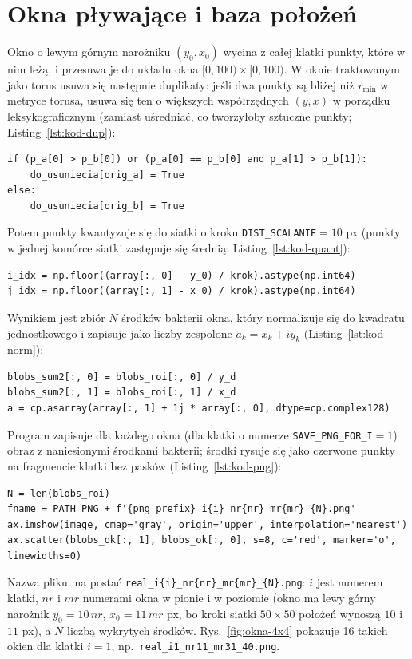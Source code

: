 \documentclass[12pt,a4paper,twoside,openright]{report}
\theoremstyle{definition}
\theoremstyle{remark}
\begin{document}
{\section{Okna pływające i baza położeń}
Okno o lewym górnym narożniku $(y_0,x_0)$ wycina z całej klatki punkty, które w nim leżą, i przesuwa je do układu okna $[0,100)\times[0,100)$. W oknie traktowanym jako torus usuwa się następnie duplikaty: jeśli dwa punkty są bliżej niż $r_{\min}$ w metryce torusa, usuwa się ten o większych współrzędnych $(y,x)$ w porządku leksykograficznym (zamiast uśredniać, co tworzyłoby sztuczne punkty; Listing~\ref{lst:kod-dup}):
\begin{lstlisting}[style=pykod,caption={Reguła usuwania duplikatów torusowych w oknie},label={lst:kod-dup}]
if (p_a[0] > p_b[0]) or (p_a[0] == p_b[0] and p_a[1] > p_b[1]):
    do_usuniecia[orig_a] = True
else:
    do_usuniecia[orig_b] = True
\end{lstlisting}
Potem punkty kwantyzuje się do siatki o kroku \texttt{DIST\_SCALANIE}$=10$ px (punkty w jednej komórce siatki zastępuje się średnią; Listing~\ref{lst:kod-quant}):
\begin{lstlisting}[style=pykod,caption={Kwantyzacja położeń do siatki o kroku \texttt{DIST\_SCALANIE}},label={lst:kod-quant}]
i_idx = np.floor((array[:, 0] - y_0) / krok).astype(np.int64)
j_idx = np.floor((array[:, 1] - x_0) / krok).astype(np.int64)
\end{lstlisting}
Wynikiem jest zbiór $N$ środków bakterii okna, który normalizuje się do kwadratu jednostkowego i zapisuje jako liczby zespolone $a_k=x_k+iy_k$ (Listing~\ref{lst:kod-norm}):
\begin{lstlisting}[style=pykod,caption={Normalizacja położeń do kwadratu jednostkowego i zapis w postaci zespolonej},label={lst:kod-norm}]
blobs_sum2[:, 0] = blobs_roi[:, 0] / y_d
blobs_sum2[:, 1] = blobs_roi[:, 1] / x_d
a = cp.asarray(array[:, 1] + 1j * array[:, 0], dtype=cp.complex128)
\end{lstlisting}
Program zapisuje dla każdego okna (dla klatki o numerze \texttt{SAVE\_PNG\_FOR\_I}$=1$) obraz z naniesionymi środkami bakterii; środki rysuje się jako czerwone punkty na fragmencie klatki bez pasków (Listing~\ref{lst:kod-png}):
\begin{lstlisting}[style=pykod,caption={Zapis okna z naniesionymi środkami bakterii (\texttt{\_zapisz\_png})},label={lst:kod-png}]
N = len(blobs_roi)
fname = PATH_PNG + f'{png_prefix}_i{i}_nr{nr}_mr{mr}_{N}.png'
ax.imshow(image, cmap='gray', origin='upper', interpolation='nearest')
ax.scatter(blobs_ok[:, 1], blobs_ok[:, 0], s=8, c='red', marker='o', linewidths=0)
\end{lstlisting}
Nazwa pliku ma postać \texttt{real\_i\{i\}\_nr\{nr\}\_mr\{mr\}\_\{N\}.png}: $i$ jest numerem klatki, $nr$ i $mr$ numerami okna w pionie i w poziomie (okno ma lewy górny narożnik $y_0=10\,nr$, $x_0=11\,mr$ px, bo kroki siatki $50\times50$ położeń wynoszą $10$ i $11$ px), a $N$ liczbą wykrytych środków. Rys.~\ref{fig:okna-4x4} pokazuje 16 takich okien dla klatki $i=1$, np.\ \texttt{real\_i1\_nr11\_mr31\_40.png}.

}
\end{document}

